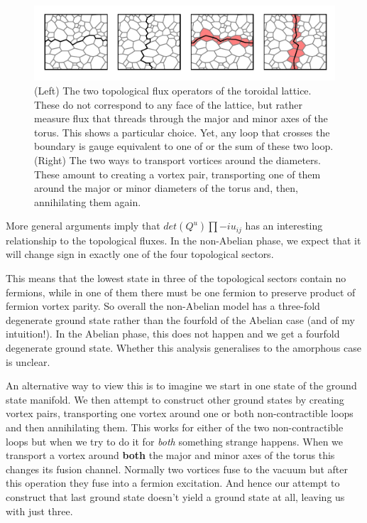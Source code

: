 \begin{figure}
\hypertarget{fig:loops_and_dual_loops}{%
\centering
\includegraphics[width=1.14\textwidth,height=\textheight]{figure_code/amk_chapter/loops_and_dual_loops/loops_and_dual_loops.pdf}
\caption{(Left) The two topological flux operators of the toroidal lattice. These do not correspond to any face of the lattice, but rather measure flux that threads through the major and minor axes of the torus. This shows a particular choice. Yet, any loop that crosses the boundary is gauge equivalent to one of or the sum of these two loop. (Right) The two ways to transport vortices around the diameters. These amount to creating a vortex pair, transporting one of them around the major or minor diameters of the torus and, then, annihilating them again.}\label{fig:loops_and_dual_loops}
}
\end{figure}

More general arguments\autocite{chungExplicitMonodromyMoore2007,oshikawaTopologicalDegeneracyNonAbelian2007} imply that \(det(Q^u) \prod -i u_{ij}\) has an interesting relationship to the topological fluxes. In the non-Abelian phase, we expect that it will change sign in exactly one of the four topological sectors.

This means that the lowest state in three of the topological sectors contain no fermions, while in one of them there must be one fermion to preserve product of fermion vortex parity. So overall the non-Abelian model has a three-fold degenerate ground state rather than the fourfold of the Abelian case (and of my intuition!). In the Abelian phase, this does not happen and we get a fourfold degenerate ground state. Whether this analysis generalises to the amorphous case is unclear.

An alternative way to view this is to imagine we start in one state of the ground state manifold. We then attempt to construct other ground states by creating vortex pairs, transporting one vortex around one or both non-contractible loops and then annihilating them. This works for either of the two non-contractible loops but when we try to do it for \emph{both} something strange happens. When we transport a vortex around \textbf{both} the major and minor axes of the torus this changes its fusion channel. Normally two vortices fuse to the vacuum but after this operation they fuse into a fermion excitation. And hence our attempt to construct that last ground state doesn't yield a ground state at all, leaving us with just three.

